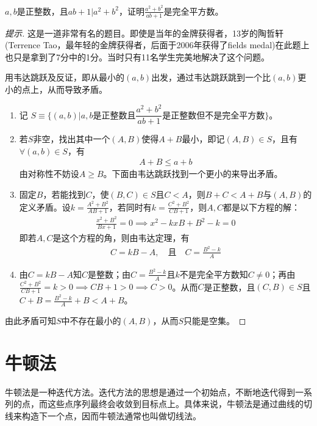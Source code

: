 \begin{example}[IMO 1988]
  $a,b$是正整数，且$ab + 1|a^2+b^2$，证明$\frac{a^2+b^2}{ab+1}$是完全平方数。
\end{example}
\begin{proof}[提示]
  这是一道非常有名的题目。即使是当年的金牌获得者，13岁的陶哲轩(Terrence Tao，最年轻的金牌获得者，后面于2006年获得了fields medal)在此题上也只是拿到了7分中的1分。当时只有11名学生完美地解决了这个问题。

  用韦达跳跃及反证，即从最小的$(a,b)$出发，通过韦达跳跃跳到一个比$(a,b)$更小的点上，从而导致矛盾。

  \begin{enumerate}
  \item 记 $S\equiv \{(a,b)|a,b\text{是正整数且}\dfrac{a^2+b^2}{ab+1}\text{是正整数但不是完全平方数}\}$。
  \item 若$S$非空，找出其中一个$(A,B)$使得$A+B$最小，即记$(A,B)\in S$，且有$\forall (a,b)\in S$，有
    \begin{align*}
      A + B \le a + b
    \end{align*}
    由对称性不妨设$A\ge B$。下面由韦达跳跃找到一个更小的来导出矛盾。
  \item 固定$B$，若能找到$C$，使$(B,C)\in S$且$C<A$，则$B+C<A+B$与$(A,B)$的定义矛盾。设$k = \frac{A^2+B^2}{AB+1}$，若同时有$k = \frac{C^2+B^2}{CB+1}$，则$A,C$都是以下方程的解：
    \begin{align*}
      \frac{x^2 + B^2}{Bx + 1} = 0 \implies x^2 - kxB + B^2 - k = 0
    \end{align*}
    即若$A,C$是这个方程的角，则由韦达定理，有
    \begin{align*}
      C = kB - A, \quad\text{且}\quad C = \frac{B^2 - k}{A}
    \end{align*}

  \item 由$C=kB - A$知$C$是整数；由$C = \frac{B^2 - k}{A}$且$k$不是完全平方数知$C\ne 0$；再由$\frac{C^2 + B^2}{CB + 1}=k>0 \implies CB+1>0 \implies C>0$。从而$C$是正整数，且$(C,B)\in S$且$C+B = \frac{B^2-k}{A} + B < A + B$。
  \end{enumerate}
  由此矛盾可知$S$中不存在最小的$(A,B)$，从而$S$只能是空集。
\end{proof}


\section{牛顿法}
\label{sec:Newton-method}

牛顿法是一种迭代方法。迭代方法的思想是通过一个初始点，不断地迭代得到一系列的点，而这些点序列最终会收敛到目标点上。具体来说，牛顿法是通过曲线的切线来构造下一个点，因而牛顿法通常也叫做切线法。

